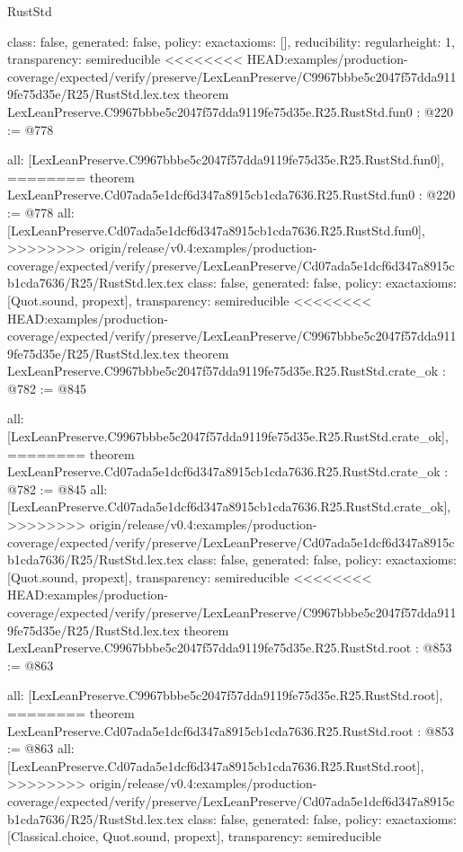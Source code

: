 \begin{lexlean}{RustStd}
\begin{coremodule}
{\begin{coremodule}
{{{  class: false,
  generated: false,
  policy: exact{axioms: []},
  reducibility: regular{height: 1},
  transparency: semireducible
}
<<<<<<<< HEAD:examples/production-coverage/expected/verify/preserve/LexLeanPreserve/C9967bbbe5c2047f57dda9119fe75d35e/R25/RustStd.lex.tex
theorem LexLeanPreserve.C9967bbbe5c2047f57dda9119fe75d35e.R25.RustStd.fun0 : @220 := @778 {
  all: [LexLeanPreserve.C9967bbbe5c2047f57dda9119fe75d35e.R25.RustStd.fun0],
========
theorem LexLeanPreserve.Cd07ada5e1dcf6d347a8915cb1cda7636.R25.RustStd.fun0 : @220 := @778 {
  all: [LexLeanPreserve.Cd07ada5e1dcf6d347a8915cb1cda7636.R25.RustStd.fun0],
>>>>>>>> origin/release/v0.4:examples/production-coverage/expected/verify/preserve/LexLeanPreserve/Cd07ada5e1dcf6d347a8915cb1cda7636/R25/RustStd.lex.tex
  class: false,
  generated: false,
  policy: exact{axioms: [Quot.sound, propext]},
  transparency: semireducible
}
<<<<<<<< HEAD:examples/production-coverage/expected/verify/preserve/LexLeanPreserve/C9967bbbe5c2047f57dda9119fe75d35e/R25/RustStd.lex.tex
theorem LexLeanPreserve.C9967bbbe5c2047f57dda9119fe75d35e.R25.RustStd.crate_ok : @782 := @845 {
  all: [LexLeanPreserve.C9967bbbe5c2047f57dda9119fe75d35e.R25.RustStd.crate_ok],
========
theorem LexLeanPreserve.Cd07ada5e1dcf6d347a8915cb1cda7636.R25.RustStd.crate_ok : @782 := @845 {
  all: [LexLeanPreserve.Cd07ada5e1dcf6d347a8915cb1cda7636.R25.RustStd.crate_ok],
>>>>>>>> origin/release/v0.4:examples/production-coverage/expected/verify/preserve/LexLeanPreserve/Cd07ada5e1dcf6d347a8915cb1cda7636/R25/RustStd.lex.tex
  class: false,
  generated: false,
  policy: exact{axioms: [Quot.sound, propext]},
  transparency: semireducible
}
<<<<<<<< HEAD:examples/production-coverage/expected/verify/preserve/LexLeanPreserve/C9967bbbe5c2047f57dda9119fe75d35e/R25/RustStd.lex.tex
theorem LexLeanPreserve.C9967bbbe5c2047f57dda9119fe75d35e.R25.RustStd.root : @853 := @863 {
  all: [LexLeanPreserve.C9967bbbe5c2047f57dda9119fe75d35e.R25.RustStd.root],
========
theorem LexLeanPreserve.Cd07ada5e1dcf6d347a8915cb1cda7636.R25.RustStd.root : @853 := @863 {
  all: [LexLeanPreserve.Cd07ada5e1dcf6d347a8915cb1cda7636.R25.RustStd.root],
>>>>>>>> origin/release/v0.4:examples/production-coverage/expected/verify/preserve/LexLeanPreserve/Cd07ada5e1dcf6d347a8915cb1cda7636/R25/RustStd.lex.tex
  class: false,
  generated: false,
  policy: exact{axioms: [Classical.choice, Quot.sound, propext]},
  transparency: semireducible
}

}}}}}
\end{coremodule}}
\end{coremodule}
\end{lexlean}
